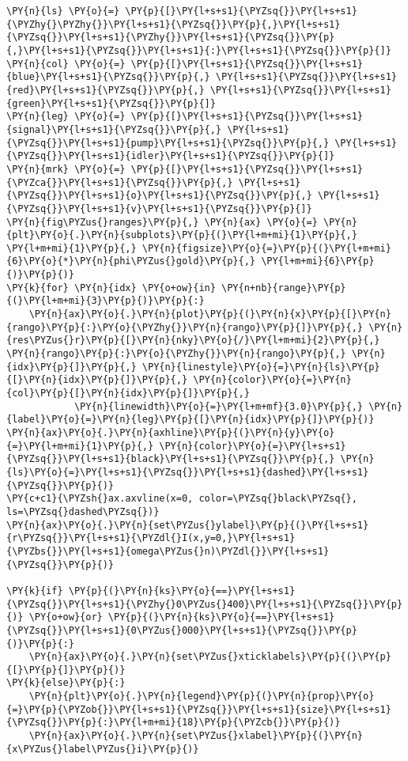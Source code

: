 \begin{Verbatim}[commandchars=\\\{\}]
\PY{n}{ls} \PY{o}{=} \PY{p}{[}\PY{l+s+s1}{\PYZsq{}}\PY{l+s+s1}{\PYZhy{}\PYZhy{}}\PY{l+s+s1}{\PYZsq{}}\PY{p}{,}\PY{l+s+s1}{\PYZsq{}}\PY{l+s+s1}{\PYZhy{}}\PY{l+s+s1}{\PYZsq{}}\PY{p}{,}\PY{l+s+s1}{\PYZsq{}}\PY{l+s+s1}{:}\PY{l+s+s1}{\PYZsq{}}\PY{p}{]}
\PY{n}{col} \PY{o}{=} \PY{p}{[}\PY{l+s+s1}{\PYZsq{}}\PY{l+s+s1}{blue}\PY{l+s+s1}{\PYZsq{}}\PY{p}{,} \PY{l+s+s1}{\PYZsq{}}\PY{l+s+s1}{red}\PY{l+s+s1}{\PYZsq{}}\PY{p}{,} \PY{l+s+s1}{\PYZsq{}}\PY{l+s+s1}{green}\PY{l+s+s1}{\PYZsq{}}\PY{p}{]}
\PY{n}{leg} \PY{o}{=} \PY{p}{[}\PY{l+s+s1}{\PYZsq{}}\PY{l+s+s1}{signal}\PY{l+s+s1}{\PYZsq{}}\PY{p}{,} \PY{l+s+s1}{\PYZsq{}}\PY{l+s+s1}{pump}\PY{l+s+s1}{\PYZsq{}}\PY{p}{,} \PY{l+s+s1}{\PYZsq{}}\PY{l+s+s1}{idler}\PY{l+s+s1}{\PYZsq{}}\PY{p}{]}
\PY{n}{mrk} \PY{o}{=} \PY{p}{[}\PY{l+s+s1}{\PYZsq{}}\PY{l+s+s1}{\PYZca{}}\PY{l+s+s1}{\PYZsq{}}\PY{p}{,} \PY{l+s+s1}{\PYZsq{}}\PY{l+s+s1}{o}\PY{l+s+s1}{\PYZsq{}}\PY{p}{,} \PY{l+s+s1}{\PYZsq{}}\PY{l+s+s1}{v}\PY{l+s+s1}{\PYZsq{}}\PY{p}{]}
\PY{n}{fig\PYZus{}ranges}\PY{p}{,} \PY{n}{ax} \PY{o}{=} \PY{n}{plt}\PY{o}{.}\PY{n}{subplots}\PY{p}{(}\PY{l+m+mi}{1}\PY{p}{,} \PY{l+m+mi}{1}\PY{p}{,} \PY{n}{figsize}\PY{o}{=}\PY{p}{(}\PY{l+m+mi}{6}\PY{o}{*}\PY{n}{phi\PYZus{}gold}\PY{p}{,} \PY{l+m+mi}{6}\PY{p}{)}\PY{p}{)}
\PY{k}{for} \PY{n}{idx} \PY{o+ow}{in} \PY{n+nb}{range}\PY{p}{(}\PY{l+m+mi}{3}\PY{p}{)}\PY{p}{:}
    \PY{n}{ax}\PY{o}{.}\PY{n}{plot}\PY{p}{(}\PY{n}{x}\PY{p}{[}\PY{n}{rango}\PY{p}{:}\PY{o}{\PYZhy{}}\PY{n}{rango}\PY{p}{]}\PY{p}{,} \PY{n}{res\PYZus{}r}\PY{p}{[}\PY{n}{nky}\PY{o}{/}\PY{l+m+mi}{2}\PY{p}{,} \PY{n}{rango}\PY{p}{:}\PY{o}{\PYZhy{}}\PY{n}{rango}\PY{p}{,} \PY{n}{idx}\PY{p}{]}\PY{p}{,} \PY{n}{linestyle}\PY{o}{=}\PY{n}{ls}\PY{p}{[}\PY{n}{idx}\PY{p}{]}\PY{p}{,} \PY{n}{color}\PY{o}{=}\PY{n}{col}\PY{p}{[}\PY{n}{idx}\PY{p}{]}\PY{p}{,}
            \PY{n}{linewidth}\PY{o}{=}\PY{l+m+mf}{3.0}\PY{p}{,} \PY{n}{label}\PY{o}{=}\PY{n}{leg}\PY{p}{[}\PY{n}{idx}\PY{p}{]}\PY{p}{)}
\PY{n}{ax}\PY{o}{.}\PY{n}{axhline}\PY{p}{(}\PY{n}{y}\PY{o}{=}\PY{l+m+mi}{1}\PY{p}{,} \PY{n}{color}\PY{o}{=}\PY{l+s+s1}{\PYZsq{}}\PY{l+s+s1}{black}\PY{l+s+s1}{\PYZsq{}}\PY{p}{,} \PY{n}{ls}\PY{o}{=}\PY{l+s+s1}{\PYZsq{}}\PY{l+s+s1}{dashed}\PY{l+s+s1}{\PYZsq{}}\PY{p}{)}
\PY{c+c1}{\PYZsh{}ax.axvline(x=0, color=\PYZsq{}black\PYZsq{}, ls=\PYZsq{}dashed\PYZsq{})}
\PY{n}{ax}\PY{o}{.}\PY{n}{set\PYZus{}ylabel}\PY{p}{(}\PY{l+s+s1}{r\PYZsq{}}\PY{l+s+s1}{\PYZdl{}I(x,y=0,}\PY{l+s+s1}{\PYZbs{}}\PY{l+s+s1}{omega\PYZus{}n)\PYZdl{}}\PY{l+s+s1}{\PYZsq{}}\PY{p}{)}

\PY{k}{if} \PY{p}{(}\PY{n}{ks}\PY{o}{==}\PY{l+s+s1}{\PYZsq{}}\PY{l+s+s1}{\PYZhy{}0\PYZus{}400}\PY{l+s+s1}{\PYZsq{}}\PY{p}{)} \PY{o+ow}{or} \PY{p}{(}\PY{n}{ks}\PY{o}{==}\PY{l+s+s1}{\PYZsq{}}\PY{l+s+s1}{0\PYZus{}000}\PY{l+s+s1}{\PYZsq{}}\PY{p}{)}\PY{p}{:}
    \PY{n}{ax}\PY{o}{.}\PY{n}{set\PYZus{}xticklabels}\PY{p}{(}\PY{p}{[}\PY{p}{]}\PY{p}{)}
\PY{k}{else}\PY{p}{:}
    \PY{n}{plt}\PY{o}{.}\PY{n}{legend}\PY{p}{(}\PY{n}{prop}\PY{o}{=}\PY{p}{\PYZob{}}\PY{l+s+s1}{\PYZsq{}}\PY{l+s+s1}{size}\PY{l+s+s1}{\PYZsq{}}\PY{p}{:}\PY{l+m+mi}{18}\PY{p}{\PYZcb{}}\PY{p}{)}
    \PY{n}{ax}\PY{o}{.}\PY{n}{set\PYZus{}xlabel}\PY{p}{(}\PY{n}{x\PYZus{}label\PYZus{}i}\PY{p}{)}


\end{Verbatim}
